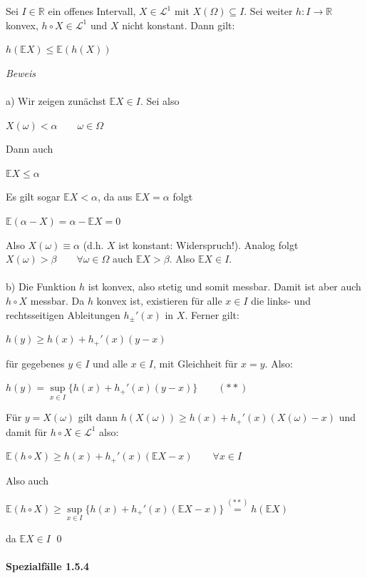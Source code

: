 \documentclass[10pt,a4paper]{report}
\numberwithin{equation}{section}
\numberwithin{figure}{section}
\theoremstyle{plain}
\theoremstyle{definition}
\theoremstyle{plain}
\theoremstyle{definition}
\theoremstyle{remark}
\theoremstyle{plain}
\theoremstyle{plain}
\theoremstyle{plain}
\newcommand{\1}{ \mathbb{1} } %
\begin{document}
Sei $I\in \mathbb{R}$ ein offenes Intervall, $X \in \mathcal{L}^1$ mit $X(\Omega)\subseteq I$. Sei weiter $h:I\to\mathbb{R}$ konvex, $h\circ X \in \mathcal{L}^1$ und $X$ nicht konstant. Dann gilt:
\begin{center}
$h(\mathbb{E}X)\leq \mathbb{E}(h(X))$
\end{center}
\textit{Beweis}\\\\
a) Wir zeigen zunächst $\mathbb{E}X \in I$. Sei also
\begin{center}
$X(\omega)< \alpha \qquad \omega \in \Omega$
\end{center}
Dann auch
\begin{center}
$\mathbb{E}X\leq \alpha$
\end{center}
Es gilt sogar $\mathbb{E}X < \alpha$, da aus $\mathbb{E}X=\alpha$ folgt 
\begin{center}
$\mathbb{E}(\alpha-X)=\alpha-\mathbb{E}X=0$
\end{center}
Also $X(\omega)\equiv \alpha$ (d.h. $X$ ist konstant: Widerspruch!). Analog folgt $X(\omega)>\beta \qquad \forall \omega \in \Omega$ auch $\mathbb{E}X> \beta$. Also $\mathbb{E}X \in I$.\\\\
b) Die Funktion $h$ ist konvex, also stetig und somit messbar. Damit ist aber auch $h\circ X$ messbar. Da $h$ konvex ist, existieren für alle $x \in I$ die links- und rechtsseitigen Ableitungen $h_\pm'(x)$ in $X$. Ferner gilt:
\begin{center}
$h(y)\geq h(x)+h_+'(x)(y-x)$
\end{center}
für gegebenes $y \in I$ und alle $x \in I$, mit Gleichheit für $x=y$. Also:
\begin{center}
$h(y)=\sup\limits_{x \in I}\{h(x)+h_+'(x)(y-x)\} \qquad (**)$
\end{center} 
Für $y=X(\omega)$ gilt dann $h(X(\omega))\geq h(x)+h_+'(x)(X(\omega)-x)$ und damit für $h\circ X \in \mathcal{L}^1$ also:\\
\begin{center}
$\mathbb{E}(h\circ X) \geq h(x)+h_+'(x)(\mathbb{E}X-x) \qquad \forall x \in I$
\end{center}
Also auch
\begin{center}
$\mathbb{E}(h\circ X)\geq \sup\limits_{x \in I}\{h(x)+h_+'(x)(\mathbb{E}X-x)\}\overset{(**)}{=}h(\mathbb{E}X)$
\end{center}
da $\mathbb{E}X\in I$ \qed\\\\
\textbf{Spezialfälle 1.5.4}\\\\
\end{document}
